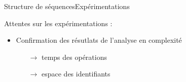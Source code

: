 \begin{frame}{Structure de séquences}{Expérimentations}

  Attentes sur les expérimentations : 
  \begin{itemize}
  \item Confirmation des résutlats de l'analyse en complexité
    \begin{itemize}
    \item [$\rightarrow$] temps des opérations
    \item [$\rightarrow$] espace des identifiants
    \end{itemize}
  \end{itemize}

\end{frame}



